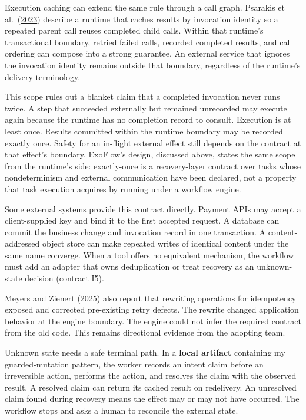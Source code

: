 Execution caching can extend the same rule through a call graph. Psarakis et al.~(\href{https://arxiv.org/abs/2312.06893}{2023}) describe a runtime that caches results by invocation identity so a repeated parent call reuses completed child calls. Within that runtime's transactional boundary, retried failed calls, recorded completed results, and call ordering can compose into a strong guarantee. An external service that ignores the invocation identity remains outside that boundary, regardless of the runtime's delivery terminology.

This scope rules out a blanket claim that a completed invocation never runs twice. A step that succeeded externally but remained unrecorded may execute again because the runtime has no completion record to consult. Execution is at least once. Results committed within the runtime boundary may be recorded exactly once. Safety for an in-flight external effect still depends on the contract at that effect's boundary. ExoFlow's design, discussed above, states the same scope from the runtime's side: exactly-once is a recovery-layer contract over tasks whose nondeterminism and external communication have been declared, not a property that task execution acquires by running under a workflow engine.

Some external systems provide this contract directly. Payment APIs may accept a client-supplied key and bind it to the first accepted request. A database can commit the business change and invocation record in one transaction. A content-addressed object store can make repeated writes of identical content under the same name converge. When a tool offers no equivalent mechanism, the workflow must add an adapter that owns deduplication or treat recovery as an unknown-state decision (contract I5).

Meyers and Zienert (2025) also report that rewriting operations for idempotency exposed and corrected pre-existing retry defects. The rewrite changed application behavior at the engine boundary. The engine could not infer the required contract from the old code. This remains directional evidence from the adopting team.

Unknown state needs a safe terminal path. In a \textbf{local artifact} containing my guarded-mutation pattern, the worker records an intent claim before an irreversible action, performs the action, and resolves the claim with the observed result. A resolved claim can return its cached result on redelivery. An unresolved claim found during recovery means the effect may or may not have occurred. The workflow stops and asks a human to reconcile the external state.

